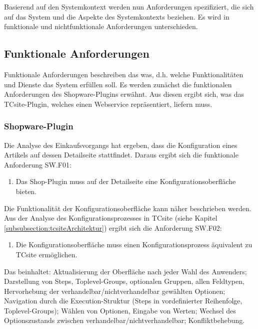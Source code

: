 \documentclass[12pt,a4paper,bibliography=totocnumbered,listof=totoc]{scrartcl}
\begin{document}
Basierend auf den Systemkontext werden nun Anforderungen spezifiziert, die sich auf das System und die Aspekte des Systemkontexts beziehen. Es wird in funktionale und nichtfunktionale Anforderungen unterschieden.

\subsection{Funktionale Anforderungen}

Funktionale Anforderungen beschreiben das \glqq was\grqq{}, d.h. welche Funktionalitäten und Dienste das System erfüllen soll. Es werden zunächst die funktionalen Anforderungen des Shopware-Plugins erwähnt. Aus diesen ergibt sich, was das TCsite-Plugin, welches einen Webservice repräsentiert, liefern muss.

\subsubsection{Shopware-Plugin}
Die Analyse des Einkaufsvorgangs hat ergeben, dass die Konfiguration eines Artikels auf dessen Detailseite stattfindet. Daraus ergibt sich die funktionale Anforderung SW.F01:
\begin{enumerate}[SW.F01:]\bfseries
\item Das Shop-Plugin muss auf der Detailseite eine Konfigurationsoberfläche bieten.
\end{enumerate}
Die Funktionalität der Konfigurationsoberfläche kann näher beschrieben werden. Aus der Analyse des Konfigurationsprozesses in TCsite (siehe Kapitel \ref{subsubsection:tcsiteArchitektur}) ergibt sich die Anforderung SW.F02:
\begin{enumerate}[SW.F02:]\bfseries
\item Die Konfigurationsoberfläche muss einen Konfigurationsprozess äquivalent zu TCsite ermöglichen. 
\end{enumerate}
Das beinhaltet: Aktualisierung der Oberfläche nach jeder Wahl des Anwenders; Darstellung von Steps, Toplevel-Groups, optionalen Gruppen, allen Feldtypen, Hervorhebung der verhandelbar/nichtverhandelbar gewählten Optionen; Navigation durch die Execution-Struktur (Steps in vordefinierter Reihenfolge, Toplevel-Groups); Wählen von Optionen, Eingabe von Werten; Wechsel des Optionszustands zwischen verhandelbar/nichtverhandelbar; Konfliktbehebung.
\end{document}
